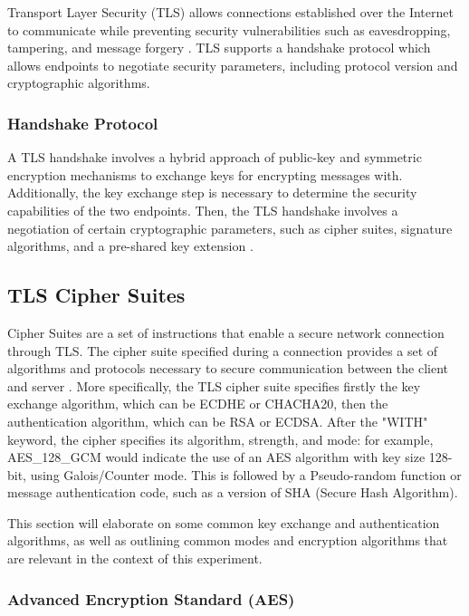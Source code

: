 \documentclass{l4proj}
\begin{document}
Transport Layer Security (TLS) allows connections established over the Internet to communicate while preventing security vulnerabilities such as eavesdropping, tampering, and message forgery \citep{Resc2018}. TLS supports a handshake protocol which allows endpoints to negotiate security parameters, including protocol version and cryptographic algorithms.

\subsubsection{Handshake Protocol} A TLS handshake involves a hybrid approach of public-key and symmetric encryption mechanisms to exchange keys for encrypting messages with. Additionally, the key exchange step is necessary to determine the security capabilities of the two endpoints. Then, the TLS handshake involves a negotiation of certain cryptographic parameters, such as cipher suites, signature algorithms, and a pre-shared key extension \citep{Resc2018}. 

\subsection{TLS Cipher Suites}

Cipher Suites are a set of instructions that enable a secure network connection through TLS. The cipher suite specified during a connection provides a set of algorithms and protocols necessary to secure communication between the client and server \citep{Siman2023}. More specifically, the TLS cipher suite specifies firstly the key exchange algorithm, which can be ECDHE or CHACHA20, then the authentication algorithm, which can be RSA or ECDSA. After the "WITH" keyword, the cipher specifies  its algorithm, strength, and mode: for example, AES\_128\_GCM would indicate the use of an AES algorithm with key size 128-bit, using Galois/Counter mode. This is followed by a Pseudo-random function or message authentication code, such as a version of SHA (Secure Hash Algorithm).

This section will elaborate on some common key exchange and authentication algorithms, as well as outlining common modes and encryption algorithms that are relevant in the context of this experiment. 

\subsubsection{Advanced Encryption Standard (AES)}
\end{document}
